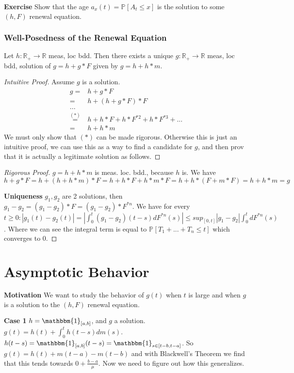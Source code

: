 \textbf{Exercise} Show that the age $a_x(t) = \mathbb{P}_{} \left[ A_t \leq x \right] $ is the solution to some $(h,F)$ renewal equation.

\subsubsection{Well-Posedness of the Renewal Equation}
\begin{theorem}[]
	Let $h: \mathbb{R}_+\to \mathbb{R}$ meas, loc bdd. Then there exists a unique $g: \mathbb{R}_+ \to \mathbb{R}$ meas, loc bdd, solution of $g = h + g*F$ given by $g=h+h*m$. 
\end{theorem}
\begin{proof}[Intuitive Proof]
	Assume $g$ is a solution. 
\begin{align*}
	g =& h + g*F \\
	=& h + (h+g*F)*F \\
	... \\
	\stackrel{(*)}{=}& h + h*F + h*F^{*2} + h*F^{*3}+... \\
	=& h + h*m
\end{align*}
We must only show that $(*)$ can be made rigorous. Otherwise this is just an intuitive proof, we can use this as a way to find a candidate for $g$, and then prov that it is actually a legitimate solution as follows.
\end{proof}
\begin{proof}[Rigorous Proof]
	$g = h + h*m$ is meas. loc. bdd., because  $h$ is. We have $h + g*F = h + (h+h*m)*F = h + h*F + h*m*F=h+h*(F+m*F)=h+h*m = g$	

\textbf{Uniqueness} 
$g_1, g_2$ are 2 solutions, then $g_1-g_2 = (g_1 - g_2)*F = (g_1 - g_2) * F^{*n}$. We have for every $t \geq 0: |g_1(t) - g_2(t)| = \left| \int_{0}^{t} (g_1 - g_2)(t-s)dF^{*n}(s) \right| \leq sup_{[0,t]} |g_1 - g_2| \int_{0}^{t} dF^{*n}(s)$. Where we can see the integral term is equal to $\mathbb{P}_{} \left[ T_1 +... +T_n \leq t \right] $ which converges to 0.
\end{proof}

\section{Asymptotic Behavior}

\textbf{Motivation} We want to study the behavior of $g(t)$ when  $t$ is large and when $g$ is a solution to the $(h,F)$ renewal equation.

\textbf{Case 1} $h=\mathbbm{1}_{[a,b]} $, and $g$ a solution. $g(t) = h(t) + \int_{0}^{t} h(t-s)dm(s)$. $h(t-s) = \mathbbm{1}_{[a,b]}(t-s) = \mathbbm{1}_{s \in [t-b, t-a]}$. So $g(t) = h(t) + m(t-a)-m(t-b)$ and with Blackwell's Theorem we find that this tends towards $0+\frac{b-a}{\mu}$. Now we need to figure out how this generalizes.

